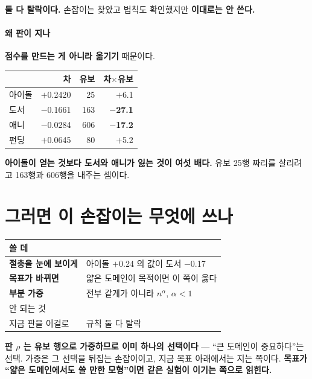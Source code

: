 \documentclass[10pt]{article}
\begin{document}
\textbf{둘 다 탈락이다.} 손잡이는 찾았고 법칙도 확인했지만 \textbf{이대로는
안 쓴다.}

\paragraph{왜 판이 지나} \textbf{점수를 만드는 게 아니라 옮기기} 때문이다.

\begin{center}\footnotesize
\begin{tabular}{lrrr}
\hline
& 차 & 유보 & 차$\times$유보 \\
\hline
아이돌 & $+$0.2420 & 25 & $+$6.1 \\
도서 & $-$0.1661 & 163 & \textbf{$-$27.1} \\
애니 & $-$0.0284 & 606 & \textbf{$-$17.2} \\
펀딩 & $+$0.0645 & 80 & $+$5.2 \\
\hline
\end{tabular}
\end{center}

\textbf{아이돌이 얻는 것보다 도서와 애니가 잃는 것이 여섯 배다.} 유보 25행
짜리를 살리려고 163행과 606행을 내주는 셈이다.

\section{그러면 이 손잡이는 무엇에 쓰나}

\begin{center}\footnotesize
\begin{tabular}{ll}
\hline
쓸 데 & \\
\hline
\textbf{절충을 눈에 보이게} & 아이돌 $+$0.24 의 값이 도서 $-$0.17 \\
\textbf{목표가 바뀌면} & 얇은 도메인이 목적이면 이 쪽이 옳다 \\
\textbf{부분 가중} & 전부 같게가 아니라 $n^{\alpha}$, $\alpha{<}1$ \\
\hline
안 되는 것 & \\
\hline
지금 판을 이걸로 & 규칙 둘 다 탈락 \\
\hline
\end{tabular}
\end{center}

\textbf{판 $\rho$ 는 유보 행으로 가중하므로 이미 하나의 선택이다} --- ``큰
도메인이 중요하다''는 선택. 가중은 그 선택을 뒤집는 손잡이이고, 지금 목표
아래에서는 지는 쪽이다. \textbf{목표가 ``얇은 도메인에서도 쓸 만한 모형''이면
같은 실험이 이기는 쪽으로 읽힌다.}
\end{document}
